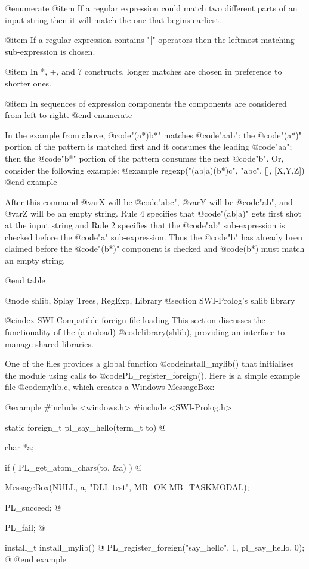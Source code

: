 {{{{{{{{@enumerate 
@item    If a regular expression could match  two  different parts of an
input string then it will match the one that begins earliest.

@item  If a regular expression contains "|"  operators  then the leftmost matching sub-expression is chosen.

@item In *, +, and ? constructs, longer matches are chosen in preference to shorter ones.

@item In sequences of expression  components  the  components are considered from left to right.
@end enumerate

In the example from above, @code{"(a*)b*"} matches @code{"aab"}: the
@code{"(a*)"} portion of the pattern is matched first and it consumes
the leading @code{"aa"}; then the @code{"b*"} portion of the pattern
consumes the next @code{"b"}.  Or, consider the following example: 
@example
  regexp("(ab|a)(b*)c",  "abc", [], [X,Y,Z])
@end example

After this command @var{X} will be @code{"abc"}, @var{Y} will be
@code{"ab"}, and @var{Z} will be an empty string.  Rule 4 specifies that
@code{"(ab|a)"} gets first shot at the input string and Rule 2 specifies
that the @code{"ab"} sub-expression is checked before the @code{"a"}
sub-expression.  Thus the @code{"b"} has already been claimed before the
@code{"(b*)"} component is checked and @code{(b*)} must match an empty string.

@end table

@node shlib, Splay Trees, RegExp, Library
@section SWI-Prolog's shlib library

@cindex SWI-Compatible foreign file loading
This section discusses the functionality of the (autoload)
@code{library(shlib)}, providing an interface to manage shared
libraries.

One of the files provides a global function @code{install_mylib()} that
initialises the module using calls to @code{PL_register_foreign()}. Here is a
simple example file @code{mylib.c}, which creates a Windows MessageBox:

@example
#include <windows.h>
#include <SWI-Prolog.h>

static foreign_t
pl_say_hello(term_t to)
@{ char *a;

  if ( PL_get_atom_chars(to, &a) )
  @{ MessageBox(NULL, a, "DLL test", MB_OK|MB_TASKMODAL);

    PL_succeed;
  @}

  PL_fail;
@}

install_t
install_mylib()
@{ PL_register_foreign("say_hello", 1, pl_say_hello, 0);
@}
@end example

}}}}}}}}
